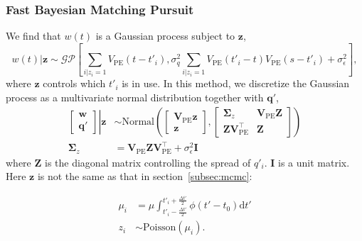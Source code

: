 \subsubsection{Fast Bayesian Matching Pursuit}
\label{subsec:fbmp}
We find that $w(t)$ is a Gaussian process subject to $\bm{z}$,
\begin{equation}
    w(t)|\bm{z} \sim \mathcal{GP}\left[\sum_{i|z_i=1}V_\mathrm{PE}(t-t'_i), \sigma_q^2 \sum_{i|z_i=1}V_\mathrm{PE}(t'_i-t)V_\mathrm{PE}(s-t'_i) + \sigma_\epsilon^2 \right],
\end{equation}
where $\bm{z}$ controls which $t'_i$ is in use. In this method, we discretize the Gaussian process as a multivariate normal distribution together with $\bm{q}'$, 
\begin{equation}
\label{eq:mgauss}
\begin{aligned}
    \left.
    \begin{bmatrix}
        \bm{w} \\
        \bm{q}'
    \end{bmatrix}
    \right\vert\bm{z}
    &\sim \mathrm{Normal}\left(
    \begin{bmatrix}
        \bm{V}_\mathrm{PE}\bm{z} \\
        \bm{z}
    \end{bmatrix}, 
    \begin{bmatrix}
        \bm{\Sigma}_z & \bm{V}_\mathrm{PE}\bm{Z} \\
        \bm{Z}\bm{V}_\mathrm{PE}^\intercal & \bm{Z}
    \end{bmatrix}
    \right) \\
    \bm{\Sigma}_z &= \bm{V}_\mathrm{PE}\bm{Z}\bm{V}_\mathrm{PE}^\intercal+\sigma_\epsilon^2\bm{I}
\end{aligned}
\end{equation}
where $\bm{Z}$ is the diagonal matrix controlling the spread of $q'_i$. $\bm{I}$ is a unit matrix. Here $\bm{z}$ is not the same as that in section~\ref{subsec:mcmc}: 

\begin{equation}
  \begin{aligned}
    \mu_i &= \mu \int_{t'_i-\frac{\Delta t'}{2}}^{t'_i+\frac{\Delta t'}{2}} \phi(t' - t_0)\mathrm{d}t' \\
    z_i &\sim \mathrm{Poisson}(\mu_i).
  \end{aligned}
  \label{eq:poissonfbmp}
\end{equation}

